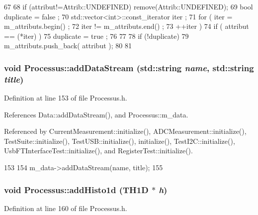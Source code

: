 \begin{DoxyCode}
67                             {
68     if (attribut!=Attrib::UNDEFINED) remove(Attrib::UNDEFINED);
69     bool duplicate = false ;
70     std::vector<int>::const_iterator iter ;
71     for ( iter  = m_attributs.begin() ;
72           iter != m_attributs.end()   ;
73           ++iter ) {
74       if ( attribut == (*iter) ) {
75         duplicate = true ;
76       }
77     }
78     if (!duplicate) {
79       m_attributs.push_back( attribut );
80     }
81   }
\end{DoxyCode}
\hypertarget{classProcessus_a308c8f193802f1d1ab49d4447d0cb281}{
\subsubsection[{addDataStream}]{\setlength{\rightskip}{0pt plus 5cm}void Processus::addDataStream (std::string {\em name}, \/  std::string {\em title})}}
\label{classProcessus_a308c8f193802f1d1ab49d4447d0cb281}


Definition at line 153 of file Processus.h.

References Data::addDataStream(), and Processus::m\_\-data.

Referenced by CurrentMeasurement::initialize(), ADCMeasurement::initialize(), TestSuite::initialize(), TestUSB::initialize(), initialize(), TestI2C::initialize(), UsbFTInterfaceTest::initialize(), and RegisterTest::initialize().


\begin{DoxyCode}
153                                                        {
154     m_data->addDataStream(name, title);
155   }
\end{DoxyCode}
\hypertarget{classProcessus_ad46e0d4dfdfdcbce001ee6be1746dfa4}{
\subsubsection[{addHisto1d}]{\setlength{\rightskip}{0pt plus 5cm}void Processus::addHisto1d (TH1D $\ast$ {\em h})}}
\label{classProcessus_ad46e0d4dfdfdcbce001ee6be1746dfa4}


Definition at line 160 of file Processus.h.

